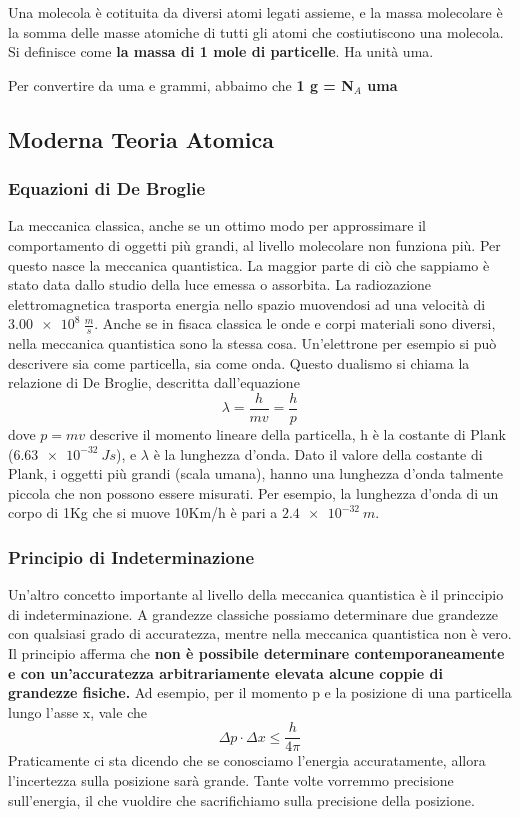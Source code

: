 \documentclass[a4paper]{article}
\begin{document}
Una molecola è cotituita da diversi atomi legati assieme, e la massa molecolare è la somma delle masse atomiche di tutti gli atomi che costiutiscono una molecola. Si definisce come \textbf{la massa di 1 mole di particelle}. Ha unità uma.

Per convertire da uma e grammi, abbaimo che \textbf{1 g = N$_A$ uma}


\subsection{Moderna Teoria Atomica}
\subsubsection{Equazioni di De Broglie}
La meccanica classica, anche se un ottimo modo per approssimare il comportamento di oggetti più grandi, al livello molecolare non funziona più. Per questo nasce la meccanica quantistica. La maggior parte di ciò che sappiamo è stato data dallo studio della luce emessa o assorbita. La radiozazione elettromagnetica trasporta energia nello spazio muovendosi ad una velocità di $\SI{3.00e8}{\frac{m}{s}}$. Anche se in fisaca classica le onde e corpi materiali sono diversi, nella meccanica quantistica sono la stessa cosa. Un'elettrone per esempio si può descrivere sia come particella, sia come onda. Questo dualismo si chiama la relazione di De Broglie, descritta dall'equazione 
\begin{equation*}
    \lambda = \frac{h}{mv}=\frac{h}{p}
\end{equation*}
dove $p=mv$ descrive il momento lineare della particella, h è la costante di Plank ($\SI{6.63e-32}{J s}$), e $\lambda$ è la lunghezza d'onda. Dato il valore della costante di Plank, i oggetti più grandi (scala umana), hanno una lunghezza d'onda talmente piccola che non possono essere misurati. Per esempio, la lunghezza d'onda  di un corpo di 1Kg che si muove 10Km/h è pari a $\SI{2.4e-32}{m}$. 

\subsubsection{Principio di Indeterminazione}
Un'altro concetto importante al livello della meccanica quantistica è il princcipio di indeterminazione. A grandezze classiche possiamo determinare due grandezze con qualsiasi grado di accuratezza, mentre nella meccanica quantistica non è vero. Il principio afferma che \textbf{non è possibile determinare contemporaneamente e con un'accuratezza arbitrariamente elevata alcune coppie di grandezze fisiche.} Ad esempio, per il momento p e la posizione di una particella lungo l'asse x, vale che 
\begin{equation*}
    \Delta p \cdot \Delta x \leq \frac{h}{4\pi}
\end{equation*}
Praticamente ci sta dicendo che se conosciamo l'energia accuratamente, allora l'incertezza sulla posizione sarà grande. Tante volte vorremmo precisione sull'energia, il che vuoldire che sacrifichiamo sulla precisione della posizione. 
\end{document}
